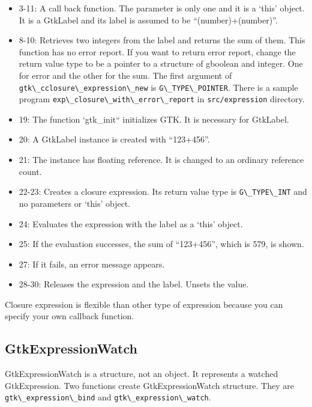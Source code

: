 \begin{itemize}
\tightlist
\item
  3-11: A call back function. The parameter is only one and it is a
  `this' object. It is a GtkLabel and its label is assumed to be
  ``(number)+(number)''.
\item
  8-10: Retrieves two integers from the label and returns the sum of
  them. This function has no error report. If you want to return error
  report, change the return value type to be a pointer to a structure of
  gboolean and integer. One for error and the other for the sum. The
  first argument of
  \passthrough{\lstinline!gtk\_cclosure\_expression\_new!} is
  \passthrough{\lstinline!G\_TYPE\_POINTER!}. There is a sample program
  \passthrough{\lstinline!exp\_closure\_with\_error\_report!} in
  \passthrough{\lstinline!src/expression!} directory.
\item
  19: The function `gtk\_init`` initializes GTK. It is necessary for
  GtkLabel.
\item
  20: A GtkLabel instance is created with ``123+456''.
\item
  21: The instance has floating reference. It is changed to an ordinary
  reference count.
\item
  22-23: Creates a closure expression. Its return value type is
  \passthrough{\lstinline!G\_TYPE\_INT!} and no parameters or `this'
  object.
\item
  24: Evaluates the expression with the label as a `this' object.
\item
  25: If the evaluation successes, the sum of ``123+456'', which is 579,
  is shown.
\item
  27: If it fails, an error message appears.
\item
  28-30: Releases the expression and the label. Unsets the value.
\end{itemize}

Closure expression is flexible than other type of expression because you
can specify your own callback function.

\subsection{GtkExpressionWatch}\label{gtkexpressionwatch}

GtkExpressionWatch is a structure, not an object. It represents a
watched GtkExpression. Two functions create GtkExpressionWatch
structure. They are \passthrough{\lstinline!gtk\_expression\_bind!} and
\passthrough{\lstinline!gtk\_expression\_watch!}.

